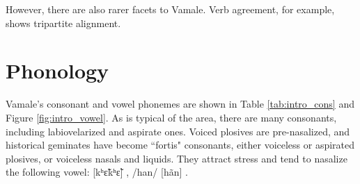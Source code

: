 However, there are also rarer facets to Vamale. Verb agreement, for example, shows tripartite alignment.


\section{Phonology}
Vamale’s consonant and vowel phonemes are shown in Table \ref{tab:intro_cons} and Figure \ref{fig:intro_vowel}. As is typical of the area, there are many consonants, including labiovelarized and aspirate ones. Voiced plosives are pre-nasalized, and historical geminates have become ``fortis" consonants, either voiceless or aspirated plosives, or voiceless nasals and liquids. They attract stress and tend to nasalize the following vowel: [kʰɛ̃kʰɛ̃] , /han/ [hãn] . 


